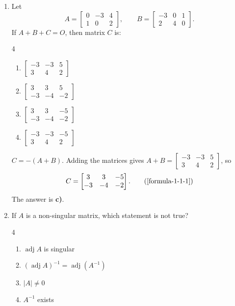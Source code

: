 \begin{enumerate}[label={},font=\normalfont,leftmargin=1.15cm,labelwidth=1.0cm,labelsep=0.15cm,itemindent=0pt,listparindent=0pt,itemsep=\baselineskip,parsep=0pt,topsep=0pt]
\item[5.1.4] Let
\[
A=\begin{bmatrix}0&-3&4\\1&0&2\end{bmatrix},\qquad
B=\begin{bmatrix}-3&0&1\\2&4&0\end{bmatrix}.
\]
If $A+B+C=O$, then matrix $C$ is:

\begin{multicols}{4}
\begin{enumerate}
\setlength{\itemsep}{0pt}
    \item $\begin{bmatrix}-3&-3&5\\3&4&2\end{bmatrix}$
    \item $\begin{bmatrix}3&3&5\\-3&-4&-2\end{bmatrix}$
    \item $\begin{bmatrix}3&3&-5\\-3&-4&-2\end{bmatrix}$
    \item $\begin{bmatrix}-3&-3&-5\\3&4&2\end{bmatrix}$
\end{enumerate}
\end{multicols}

\vspace{0.6em}\par\solution


$C=-(A+B)$. Adding the matrices gives $A+B=\begin{bmatrix}-3&-3&5\\3&4&2\end{bmatrix}$, so
\begin{equation*}
C=\begin{bmatrix}3&3&-5\\-3&-4&-2\end{bmatrix}.
\tag*{(\ref{formula-1-1-1})}\end{equation*}
The answer is \textbf{c)}.

\item[5.1.5] If $A$ is a non-singular matrix, which statement is not true?

\begin{multicols}{4}
\begin{enumerate}
\setlength{\itemsep}{0pt}
    \item $\operatorname{adj} A$ is singular
    \item $(\operatorname{adj} A)^{-1}=\operatorname{adj}(A^{-1})$
    \item $|A|\ne0$
    \item $A^{-1}$ exists
\end{enumerate}
\end{multicols}


\end{enumerate}
